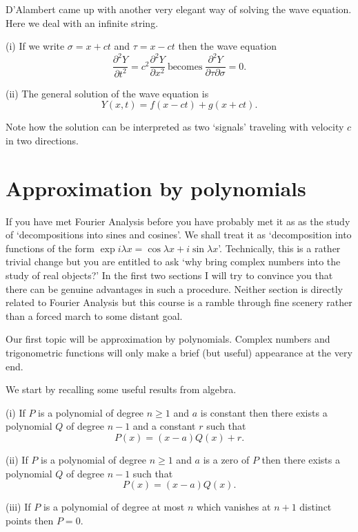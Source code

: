 D'Alambert came up with another very elegant way of solving
the wave equation. Here we deal with an infinite string.
\begin{lemma} (i) If we write $\sigma=x+ct$
and $\tau=x-ct$ then the wave equation
\[\frac{\partial^{2} Y}{\partial t^{2}}
=c^{2}\frac{\partial^{2} Y}{\partial x^{2}}
\ \text{becomes}
\  \frac{\partial^{2} Y}{\partial \tau\partial \sigma}=0.\]

(ii) The general solution of the wave equation is
\[Y(x,t)=f(x-ct)+g(x+ct).\]
\end{lemma}
Note how the solution can be interpreted as two `signals'
traveling with velocity $c$ in two directions.




\section{Approximation by polynomials}\label{S, Polynomial}
If you have met Fourier Analysis before you have probably
met it as as the study of `decompositions into sines and cosines'.
We shall treat it as `decomposition into functions of
the form $\exp i\lambda x=\cos\lambda x+i\sin\lambda x$'.
Technically, this is a rather trivial change but you are
entitled to ask `why bring complex numbers into the study
of real objects?' In the first two sections I will try
to convince you that there can be genuine advantages
in such a procedure. Neither section is directly related
to Fourier Analysis but this course is a ramble through
fine scenery rather than a forced march to some distant
goal.

Our first topic will be approximation by polynomials.
Complex numbers and trigonometric functions will only make
a brief (but useful) appearance at the very end.

We start by recalling some useful results from algebra.
\begin{lemma}\label{L, Division algorithm}
(i) If $P$ is a polynomial of degree $n\geq 1$
and $a$ is constant then there exists a polynomial $Q$
of degree $n-1$ and a constant $r$ such that
\[P(x)=(x-a)Q(x)+r.\]

(ii) If $P$ is a polynomial of degree $n\geq 1$
and $a$ is a zero of $P$ then there exists a polynomial $Q$
of degree $n-1$ such that
\[P(x)=(x-a)Q(x).\]

(iii) If $P$ is a polynomial of degree at most $n$ which
vanishes at $n+1$ distinct points then $P=0$.
\end{lemma}

